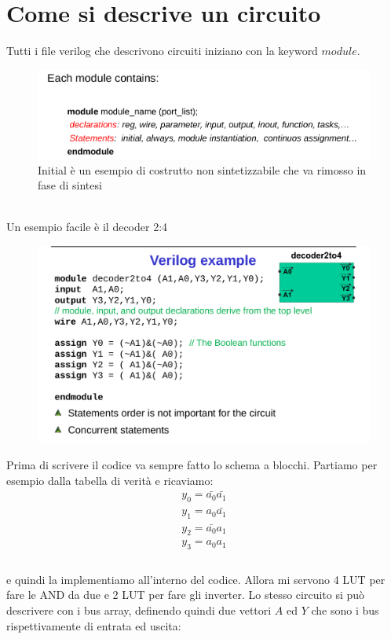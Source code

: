 \documentclass{book}
\begin{document}
    \section{Come si descrive un circuito}
        Tutti i file verilog che descrivono circuiti iniziano con la keyword $module$.
        \begin{figure}[h!]
            \centering
            \includegraphics[width=0.75\linewidth]{img/chapt7img1.png}
            \caption{Initial è un esempio di costrutto non sintetizzabile che va rimosso in fase di sintesi}
        \end{figure} \\
    Un esempio facile è il decoder 2:4
    \begin{figure}[h!]
        \centering
        \includegraphics[width=0.75\linewidth]{img/chapt7img2.png}
    \end{figure}
    Prima di scrivere il codice va sempre fatto lo schema a blocchi. Partiamo per esempio dalla tabella di verità e ricaviamo:
    \begin{align}
        y_{0} = \bar{a_{0}}\bar{a_{1}} \\
        y_{1} = a_{0}\bar{a_{1}} \\
        y_{2} = \bar{a_{0}}a_{1} \\
        y_{3} = a_{0}a_{1} \\
    \end{align}
    \\ e quindi la implementiamo all'interno del codice. Allora mi servono 4 LUT per fare le AND da due e 2 LUT per fare gli inverter. \newpage
    Lo stesso circuito si può descrivere con i bus array, definendo quindi due vettori $A$ ed $Y$ che sono i bus rispettivamente di entrata ed uscita:
\end{document}
